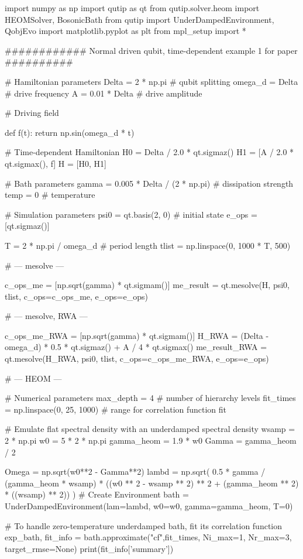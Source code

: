 import numpy as np
import qutip as qt
from qutip.solver.heom import HEOMSolver, BosonicBath
from qutip import UnderDampedEnvironment, QobjEvo
import matplotlib.pyplot as plt
from mpl_setup import *


############ Normal driven qubit, time-dependent example 1 for paper ##########


# Hamiltonian parameters
Delta = 2 * np.pi  # qubit splitting
omega_d = Delta  # drive frequency
A = 0.01 * Delta  # drive amplitude

# Driving field


def f(t):
    return np.sin(omega_d * t)


# Time-dependent Hamiltonian
H0 = Delta / 2.0 * qt.sigmaz()
H1 = [A / 2.0 * qt.sigmax(), f]
H = [H0, H1]

# Bath parameters
gamma = 0.005 * Delta / (2 * np.pi)  # dissipation strength
temp = 0  # temperature

# Simulation parameters
psi0 = qt.basis(2, 0)  # initial state
e_ops = [qt.sigmaz()]

T = 2 * np.pi / omega_d  # period length
tlist = np.linspace(0, 1000 * T, 500)


# --- mesolve ---

c_ops_me = [np.sqrt(gamma) * qt.sigmam()]
me_result = qt.mesolve(H, psi0, tlist, c_ops=c_ops_me, e_ops=e_ops)


# --- mesolve, RWA ---

c_ops_me_RWA = [np.sqrt(gamma) * qt.sigmam()]
H_RWA = (Delta - omega_d) * 0.5 * qt.sigmaz() + A / 4 * qt.sigmax()
me_result_RWA = qt.mesolve(H_RWA, psi0, tlist, c_ops=c_ops_me_RWA, e_ops=e_ops)


# --- HEOM ---

# Numerical parameters
max_depth = 4  # number of hierarchy levels
fit_times = np.linspace(0, 25, 1000)  # range for correlation function fit

# Emulate flat spectral density with an underdamped spectral density
wsamp = 2 * np.pi
w0 = 5 * 2 * np.pi
gamma_heom = 1.9 * w0
Gamma = gamma_heom / 2

Omega = np.sqrt(w0**2 - Gamma**2)
lambd = np.sqrt(
    0.5 * gamma / (gamma_heom * wsamp) *
    ((w0 ** 2 - wsamp ** 2) ** 2 + (gamma_heom ** 2) * ((wsamp) ** 2))
)
# Create Environment
bath = UnderDampedEnvironment(lam=lambd, w0=w0, gamma=gamma_heom, T=0)

# To handle zero-temperature underdamped bath, fit its correlation function
exp_bath, fit_info = bath.approximate("cf",fit_times, Ni_max=1, Nr_max=3, target_rmse=None)
print(fit_info['summary'])



